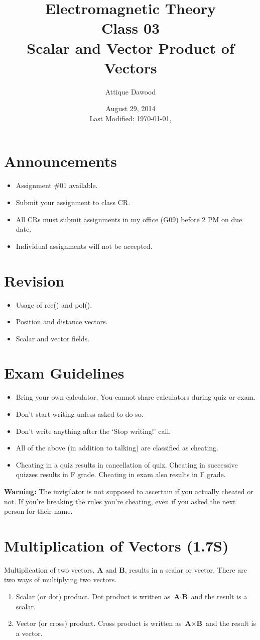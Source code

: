 \documentclass[12pt,a4paper]{article}
\title{Electromagnetic Theory\\Class 03\\Scalar and Vector Product of Vectors}
\author{Attique Dawood}
\date{August 29, 2014\\[0.2cm] Last Modified: \today, \currenttime}
\begin{document}
\maketitle
\section{Announcements}
\begin{itemize}
\item Assignment \#01 available.
\item Submit your assignment to class CR.
\item All CRs must submit assignments in my office (G09) before 2 PM on due date.
\item Individual assignments will not be accepted.
\end{itemize}
\section{Revision}
\begin{itemize}
\item Usage of rec() and pol().
\item Position and distance vectors.
\item Scalar and vector fields.
\end{itemize}
\section{Exam Guidelines}
\begin{itemize}
\item Bring your own calculator. You cannot share calculators during quiz or exam.
\item Don't start writing unless asked to do so.
\item Don't write anything after the `Stop writing!' call.
\item All of the above (in addition to talking) are classified as cheating.
\item Cheating in a quiz results in cancellation of quiz. Cheating in successive quizzes results in F grade. Cheating in exam also results in F grade.
\end{itemize}
\textbf{Warning:} The invigilator is not supposed to ascertain if you actually cheated or not. If you're breaking the rules you're cheating, even if you asked the next person for their name.
\section{Multiplication of Vectors (1.7S)}
Multiplication of two vectors, \textbf{A} and \textbf{B}, results in a scalar or vector. There are two ways of multiplying two vectors.
\begin{enumerate}
\item Scalar (or dot) product. Dot product is written as $\textbf{A}\cdot \textbf{B}$ and the result is a scalar.
\item Vector (or cross) product. Cross product is written as $\textbf{A}\times \textbf{B}$ and the result is a vector.
\end{enumerate}
\end{document}

